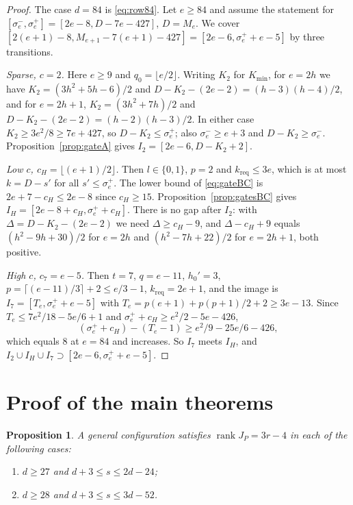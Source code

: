 \documentclass{amsart}
\newtheorem{proposition}[theorem]{Proposition}
\theoremstyle{definition}
\theoremstyle{remark}
\numberwithin{equation}{section}
\DeclareMathOperator{\rank}{rank}
\begin{document}
\begin{proof}
The case $d=84$ is \eqref{eq:row84}. Let $e\ge84$ and assume the statement for
$[\sigma^-_e,\sigma^+_e]=[2e-8,D-7e-427]$, $D=M_e$. We cover $[2(e+1)-8,M_{e+1}-7(e+1)-427]=
[2e-6,\sigma^+_e+e-5]$ by three transitions.

\emph{Sparse, $c=2$.} Here $e\ge9$ and $q_0=\lfloor e/2\rfloor$. Writing $K_2$ for
$K_{\min}$, for $e=2h$ we have $K_2=(3h^2+5h-6)/2$ and $D-K_2-(2e-2)=(h-3)(h-4)/2$, and
for $e=2h+1$, $K_2=(3h^2+7h)/2$ and $D-K_2-(2e-2)=(h-2)(h-3)/2$. In either case
$K_2\ge3e^2/8\ge7e+427$, so $D-K_2\le \sigma^+_e$; also $\sigma^-_e\ge e+3$ and $D-K_2\ge \sigma^-_e$.
Proposition~\ref{prop:gateA} gives $I_2=[2e-6,D-K_2+2]$.

\emph{Low $c$, $c_H=\lfloor(e+1)/2\rfloor$.} Then $l\in\{0,1\}$, $p=2$ and
$k_{\mathrm{req}}\le3e$, which is at most $k=D-s'$ for all $s'\le \sigma^+_e$. The lower bound of
\eqref{eq:gateBC} is $2e+7-c_H\le2e-8$ since $c_H\ge15$. Proposition~\ref{prop:gatesBC}
gives $I_H=[2e-8+c_H,\sigma^+_e+c_H]$. There is no gap after $I_2$: with
$\Delta=D-K_2-(2e-2)$ we need $\Delta\ge c_H-9$, and $\Delta-c_H+9$ equals
$(h^2-9h+30)/2$ for $e=2h$ and $(h^2-7h+22)/2$ for $e=2h+1$, both positive.

\emph{High $c$, $c_7=e-5$.} Then $t=7$, $q=e-11$, $h_0'=3$,
$p=\lceil(e-11)/3\rceil+2\le e/3-1$, $k_{\mathrm{req}}=2e+1$, and the image is
$I_7=[T_e,\sigma^+_e+e-5]$ with $T_e=p(e+1)+p(p+1)/2+2\ge3e-13$. Since
$T_e\le7e^2/18-5e/6+1$ and $\sigma^+_e+c_H\ge e^2/2-5e-426$,
\[
  (\sigma^+_e+c_H)-(T_e-1)\ge e^2/9-25e/6-426 ,
\]
which equals $8$ at $e=84$ and increases. So $I_7$ meets $I_H$, and
$I_2\cup I_H\cup I_7\supset[2e-6,\sigma^+_e+e-5]$.
\end{proof}

\section{Proof of the main theorems}\label{sec:proof}

\begin{proposition}\label{prop:bands}
A general configuration satisfies $\rank J_P=3r-4$ in each of the following cases:
\begin{enumerate}[label=\textup{(\alph*)}]
\item $d\ge27$ and $d+3\le s\le2d-24$;
\item $d\ge28$ and $d+3\le s\le3d-52$.
\end{enumerate}
\end{proposition}
\end{document}
